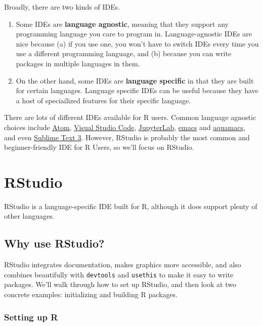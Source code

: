 \documentclass[
]{book}
\providecommand{\tightlist}{%
  \setlength{\itemsep}{0pt}\setlength{\parskip}{0pt}}
\begin{document}
Broadly, there are two kinds of IDEs.

\begin{enumerate}
\def\labelenumi{\arabic{enumi}.}
\tightlist
\item
  Some IDEs are \textbf{language agnostic}, meaning that they support any programming language you care to program in. Language-agnostic IDEs are nice because (a) if you use one, you won't have to switch IDEs every time you use a different programming language, and (b) because you can write packages in multiple languages in them.
\item
  On the other hand, some IDEs are \textbf{language specific} in that they are built for certain languages. Language specific IDEs can be useful because they have a host of speciailized features for their specific language.
\end{enumerate}

There are lots of different IDEs available for R users. Common language agnostic choices include \href{https://atom.io/}{Atom}, \href{https://code.visualstudio.com/}{Visual Studio Code}, \href{https://github.com/jupyterlab}{JupyterLab}, \href{https://www.gnu.org/software/emacs/}{emacs} and \href{http://aquamacs.org/}{aquamacs}, and even \href{https://www.sublimetext.com/}{Sublime Text 3}. However, RStudio is probably the most common and beginner-friendly IDE for R Users, so we'll focus on RStudio.

\hypertarget{rstudio}{%
\section{RStudio}\label{rstudio}}

RStudio is a language-specific IDE built for R, although it does support plenty of other languages.

\hypertarget{why-use-rstudio}{%
\subsection{Why use RStudio?}\label{why-use-rstudio}}

RStudio integrates documentation, makes graphics more accessible, and also combines beautifully with \texttt{devtools} and \texttt{usethis} to make it easy to write packages. We'll walk through how to set up RStudio, and then look at two concrete examples: initializing and building R packages.

\hypertarget{setting-up-r}{%
\subsubsection{Setting up R}\label{setting-up-r}}
\end{document}
